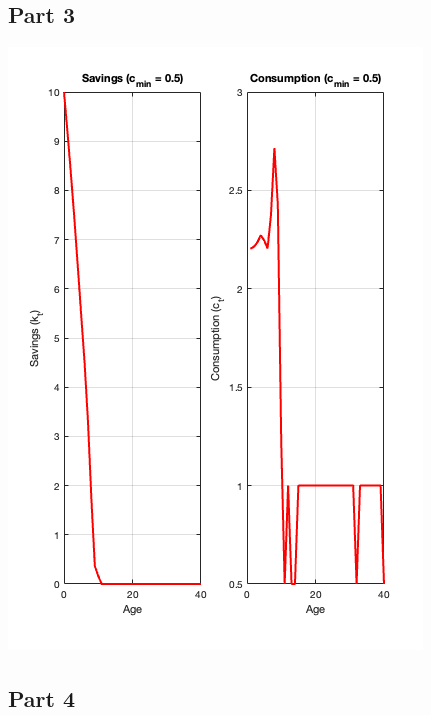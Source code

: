 \documentclass[10pt,a4paper]{article}
\begin{document}
\subsection*{Part 3}

\includegraphics[scale=0.5]{higher_cmin_lifecycle.png}

\subsection*{Part 4}
\end{document}
